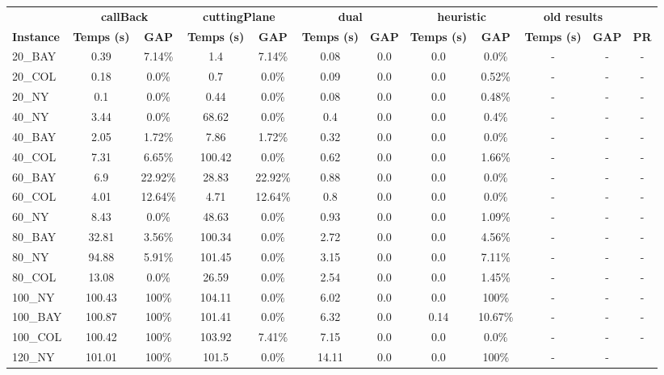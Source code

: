 \documentclass[main.tex]{subfiles}
\begin{document}
\begin{center}
\renewcommand{\arraystretch}{1.4} 
\begin{tabular}{lccccccccccc}
	\hline
 & \multicolumn{2}{c}{\textbf{callBack}} & \multicolumn{2}{c}{\textbf{cuttingPlane}} & \multicolumn{2}{c}{\textbf{dual}} & \multicolumn{2}{c}{\textbf{heuristic}} & \multicolumn{2}{c}{\textbf{old results}}\\
\textbf{Instance}  & \textbf{Temps (s)} & \textbf{GAP} & \textbf{Temps (s)} & \textbf{GAP} & \textbf{Temps (s)} & \textbf{GAP} & \textbf{Temps (s)} & \textbf{GAP} & \textbf{Temps (s)} & \textbf{GAP} & \textbf{PR} \\\hline

20\_BAY & 0.39 & 7.14\% & 1.4 & 7.14\% & 0.08 & 0.0 & 0.0 & 0.0\% & - & - 
 & - \\
20\_COL & 0.18 & 0.0\% & 0.7 & 0.0\% & 0.09 & 0.0 & 0.0 & 0.52\% & - & - 
 & - \\
20\_NY & 0.1 & 0.0\% & 0.44 & 0.0\% & 0.08 & 0.0 & 0.0 & 0.48\% & - & - 
 & - \\
40\_NY & 3.44 & 0.0\% & 68.62 & 0.0\% & 0.4 & 0.0 & 0.0 & 0.4\% & - & - 
 & - \\
40\_BAY & 2.05 & 1.72\% & 7.86 & 1.72\% & 0.32 & 0.0 & 0.0 & 0.0\% & - & - 
 & - \\
40\_COL & 7.31 & 6.65\% & 100.42 & 0.0\% & 0.62 & 0.0 & 0.0 & 1.66\% & - & - 
 & - \\
60\_BAY & 6.9 & 22.92\% & 28.83 & 22.92\% & 0.88 & 0.0 & 0.0 & 0.0\% & - & - 
 & - \\
60\_COL & 4.01 & 12.64\% & 4.71 & 12.64\% & 0.8 & 0.0 & 0.0 & 0.0\% & - & - 
 & - \\
60\_NY & 8.43 & 0.0\% & 48.63 & 0.0\% & 0.93 & 0.0 & 0.0 & 1.09\% & - & - 
 & - \\
80\_BAY & 32.81 & 3.56\% & 100.34 & 0.0\% & 2.72 & 0.0 & 0.0 & 4.56\% & - & - 
 & - \\
80\_NY & 94.88 & 5.91\% & 101.45 & 0.0\% & 3.15 & 0.0 & 0.0 & 7.11\% & - & - 
 & - \\
80\_COL & 13.08 & 0.0\% & 26.59 & 0.0\% & 2.54 & 0.0 & 0.0 & 1.45\% & - & - 
 & - \\
100\_NY & 100.43 &  100\%  & 104.11 & 0.0\% & 6.02 & 0.0 & 0.0 &  100\%  & - & - 
 & - \\
100\_BAY & 100.87 &  100\%  & 101.41 & 0.0\% & 6.32 & 0.0 & 0.14 & 10.67\% & - & - 
 & - \\
100\_COL & 100.42 &  100\%  & 103.92 & 7.41\% & 7.15 & 0.0 & 0.0 & 0.0\% & - & - 
 & - \\
120\_NY & 101.01 &  100\%  & 101.5 & 0.0\% & 14.11 & 0.0 & 0.0 &  100\%  & - & - 

\end{tabular}
\end{center}
\end{document}
